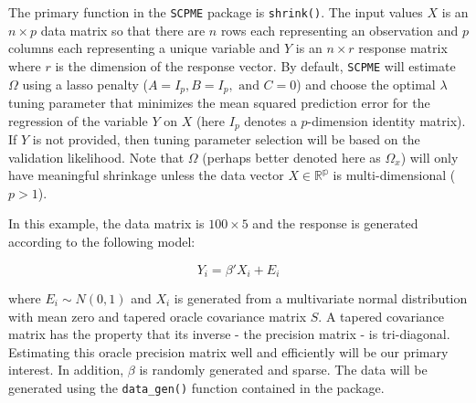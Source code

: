 \documentclass[11pt,]{report}
\newenvironment{Shaded}{\begin{snugshade}}{\end{snugshade}}
\newcommand{\CommentTok}[1]{\textcolor[rgb]{0.56,0.35,0.01}{\textit{#1}}}
\newcommand{\DataTypeTok}[1]{\textcolor[rgb]{0.13,0.29,0.53}{#1}}
\newcommand{\DecValTok}[1]{\textcolor[rgb]{0.00,0.00,0.81}{#1}}
\newcommand{\KeywordTok}[1]{\textcolor[rgb]{0.13,0.29,0.53}{\textbf{#1}}}
\newcommand{\NormalTok}[1]{#1}
\newcommand{\OperatorTok}[1]{\textcolor[rgb]{0.81,0.36,0.00}{\textbf{#1}}}
\newcommand{\StringTok}[1]{\textcolor[rgb]{0.31,0.60,0.02}{#1}}
\theoremstyle{definition}
\theoremstyle{definition}
\theoremstyle{definition}
\theoremstyle{remark}
\begin{document}
The primary function in the \texttt{SCPME} package is \texttt{shrink()}. The input values \(X\) is an \(n \times p\) data matrix so that there are \(n\) rows each representing an observation and \(p\) columns each representing a unique variable and \(Y\) is an \(n \times r\) response matrix where \(r\) is the dimension of the response vector. By default, \texttt{SCPME} will estimate \(\Omega\) using a lasso penalty (\(A = I_{p}, B = I_{p}, \mbox{ and } C = 0\)) and choose the optimal \(\lambda\) tuning parameter that minimizes the mean squared prediction error for the regression of the variable \(Y\) on \(X\) (here \(I_{p}\) denotes a \(p\)-dimension identity matrix). If \(Y\) is not provided, then tuning parameter selection will be based on the validation likelihood. Note that \(\Omega\) (perhaps better denoted here as \(\Omega_{x}\)) will only have meaningful shrinkage unless the data vector \(X \in \mathbb{R^{p}}\) is multi-dimensional (\(p > 1\)).

In this example, the data matrix is \(100 \times 5\) and the response is generated according to the following model:

\[ Y_{i} = \beta'X_{i} + E_{i} \]

where \(E_{i} \sim N\left( 0, 1 \right)\) and \(X_{i}\) is generated from a multivariate normal distribution with mean zero and tapered oracle covariance matrix \(S\). A tapered covariance matrix has the property that its inverse - the precision matrix - is tri-diagonal. Estimating this oracle precision matrix well and efficiently will be our primary interest. In addition, \(\beta\) is randomly generated and sparse. The data will be generated using the \texttt{data\_gen()} function contained in the package.

\vspace{0.5cm}

\begin{Shaded}
\end{Shaded}
\end{document}
